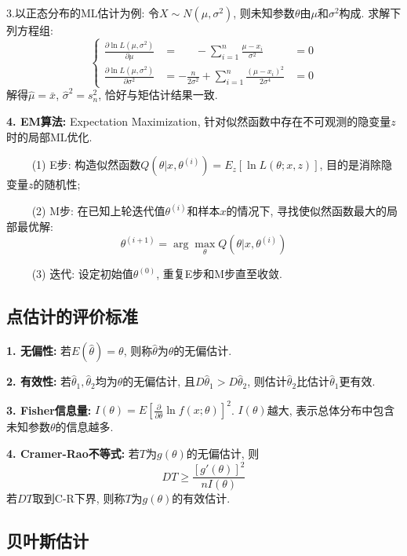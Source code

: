 3.以正态分布的ML估计为例: 令$X \sim N(\mu,\sigma^2)$, 则未知参数$\theta$由$\mu$和$\sigma^2$构成. 求解下列方程组:
\begin{equation*}
    \left\{\begin{aligned}
        \frac{\partial \ln L(\mu,\sigma^2)}{\partial \mu} & = ~~~~~~~-\sum\limits_{i=1}^n \frac{\mu -x_i}{\sigma^2}&=0\\
        \frac{\partial \ln L(\mu,\sigma^2)}{\partial \sigma^2} & = -\frac{n}{2\sigma^2}+\sum\limits_{i=1}^n \frac{(\mu -x_i)^2}{2\sigma^4}&=0
    \end{aligned}\right.
\end{equation*}
解得$\hat{\mu}=\bar{x}$, $\hat{\sigma}^2=s_n^2$, 恰好与矩估计结果一致.

\textbf{4. EM算法: }Expectation Maximization, 针对似然函数中存在不可观测的隐变量$z$时的局部ML优化.

~~~~ (1) E步: 构造似然函数$Q(\theta | x,\theta^{(i)})=E_z[\ln L(\theta;x,z)]$, 目的是消除隐变量$z$的随机性;

~~~~ (2) M步: 在已知上轮迭代值$\theta^{(i)}$和样本$x$的情况下, 寻找使似然函数最大的局部最优解:
\begin{equation*}
    \theta^{(i+1)}=\arg \max\limits_{\theta} Q(\theta |x, \theta^{(i)})
\end{equation*}

~~~~ (3) 迭代: 设定初始值$\theta^{(0)}$, 重复E步和M步直至收敛.

\subsection{点估计的评价标准}

\textbf{1. 无偏性: }若$E(\hat{\theta})=\theta$, 则称$\hat{\theta}$为$\theta$的无偏估计.

\textbf{2. 有效性: }若$\hat{\theta}_1, \hat{\theta}_2$均为$\theta$的无偏估计, 且$D\hat{\theta}_1>D\hat{\theta}_2$, 则估计$\hat{\theta}_2$比估计$\hat{\theta}_1$更有效.

\textbf{3. Fisher信息量: }$I(\theta)=E\left[\frac{\partial}{\partial \theta}\ln f(x;\theta)\right]^2$. $I(\theta)$越大, 表示总体分布中包含未知参数$\theta$的信息越多.

\textbf{4. Cramer-Rao不等式: }若$T$为$g(\theta)$的无偏估计, 则
\begin{equation*}
    DT \geq \frac{[g'(\theta)]^2}{nI(\theta)}
\end{equation*}
若$DT$取到C-R下界, 则称$T$为$g(\theta)$的有效估计.

\subsection{贝叶斯估计}

